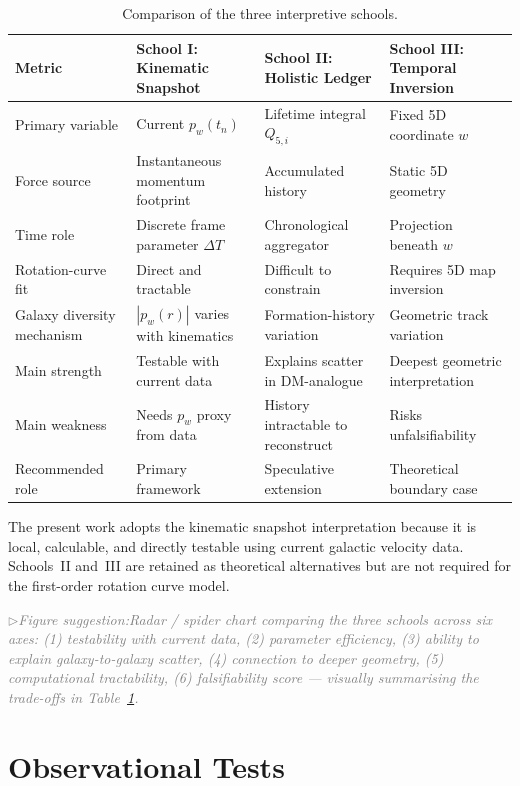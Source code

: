 \documentclass[11pt,a4paper]{article}
\newcommand{\pw}{p_w}                        %
\newcommand{\figsuggest}[1]{%
  \medskip
  \noindent\hspace{0pt}\textcolor{gray}{\small\itshape
    $\triangleright$\;Figure suggestion:\enspace #1}%
  \medskip}
\begin{document}
\begin{table}[H]
\centering
\caption{Comparison of the three interpretive schools.}
\label{tab:schools}
\begin{tabularx}{\textwidth}{@{}lXXX@{}}
\toprule
Metric & School I: Kinematic Snapshot & School II: Holistic Ledger & School III: Temporal Inversion \\
\midrule
Primary variable & Current $\pw(t_n)$ & Lifetime integral $Q_{5,i}$ & Fixed 5D coordinate $w$ \\[4pt]
Force source & Instantaneous momentum footprint & Accumulated history & Static 5D geometry \\[4pt]
Time role & Discrete frame parameter $\Delta T$ & Chronological aggregator & Projection beneath $w$ \\[4pt]
Rotation-curve fit & Direct and tractable & Difficult to constrain & Requires 5D map inversion \\[4pt]
Galaxy diversity mechanism & $|\pw(r)|$ varies with kinematics & Formation-history variation & Geometric track variation \\[4pt]
Main strength & Testable with current data & Explains scatter in DM-analogue & Deepest geometric interpretation \\[4pt]
Main weakness & Needs $\pw$ proxy from data & History intractable to reconstruct & Risks unfalsifiability \\[4pt]
Recommended role & Primary framework & Speculative extension & Theoretical boundary case \\
\bottomrule
\end{tabularx}
\end{table}

\noindent
The present work adopts the kinematic snapshot interpretation because it is
local, calculable, and directly testable using current galactic velocity data.
Schools~II and~III are retained as theoretical alternatives but are not
required for the first-order rotation curve model.

\figsuggest{Radar / spider chart comparing the three schools across six axes:
(1) testability with current data, (2) parameter efficiency, (3) ability to
explain galaxy-to-galaxy scatter, (4) connection to deeper geometry,
(5) computational tractability, (6) falsifiability score --- visually
summarising the trade-offs in Table~\ref{tab:schools}.}

\section{Observational Tests}\label{sec:tests}
\end{document}

